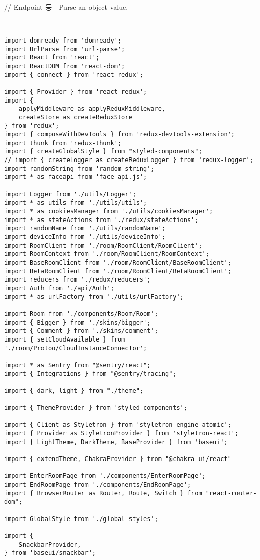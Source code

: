 \documentclass{article}
\begin{document}
// Endpoint 등 - Parse an object value.
\begin{lstlisting}


import domready from 'domready';
import UrlParse from 'url-parse';
import React from 'react';
import ReactDOM from 'react-dom';
import { connect } from 'react-redux';

import { Provider } from 'react-redux';
import {
	applyMiddleware as applyReduxMiddleware,
	createStore as createReduxStore
} from 'redux';
import { composeWithDevTools } from 'redux-devtools-extension';
import thunk from 'redux-thunk';
import { createGlobalStyle } from "styled-components";
// import { createLogger as createReduxLogger } from 'redux-logger';
import randomString from 'random-string';
import * as faceapi from 'face-api.js';

import Logger from './utils/Logger';
import * as utils from './utils/utils';
import * as cookiesManager from './utils/cookiesManager';
import * as stateActions from './redux/stateActions';
import randomName from './utils/randomName';
import deviceInfo from './utils/deviceInfo';
import RoomClient from './room/RoomClient/RoomClient';
import RoomContext from './room/RoomClient/RoomContext';
import BaseRoomClient from './room/RoomClient/BaseRoomClient';
import BetaRoomClient from './room/RoomClient/BetaRoomClient';
import reducers from './redux/reducers';
import Auth from './api/Auth';
import * as urlFactory from './utils/urlFactory';

import Room from './components/Room/Room';
import { Bigger } from './skins/bigger';
import { Comment } from './skins/comment';
import { setCloudAvailable } from './room/Protoo/CloudInstanceConnector';

import * as Sentry from "@sentry/react";
import { Integrations } from "@sentry/tracing";

import { dark, light } from "./theme";

import { ThemeProvider } from 'styled-components';

import { Client as Styletron } from 'styletron-engine-atomic';
import { Provider as StyletronProvider } from 'styletron-react';
import { LightTheme, DarkTheme, BaseProvider } from 'baseui';

import { extendTheme, ChakraProvider } from "@chakra-ui/react"

import EnterRoomPage from './components/EnterRoomPage';
import EndRoomPage from './components/EndRoomPage';
import { BrowserRouter as Router, Route, Switch } from "react-router-dom";

import GlobalStyle from './global-styles';

import {
	SnackbarProvider,
} from 'baseui/snackbar';


\end{lstlisting}
\end{document}
